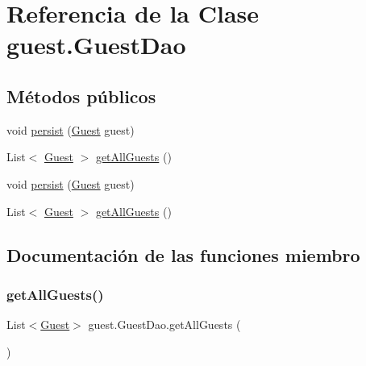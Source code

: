 \hypertarget{classguest_1_1_guest_dao}{}\section{Referencia de la Clase guest.\+Guest\+Dao}
\label{classguest_1_1_guest_dao}
\subsection*{Métodos públicos}
\begin{DoxyCompactItemize}
\item 
void \mbox{\hyperlink{classguest_1_1_guest_dao_a66dea98c577adb8b65be3f0f89862f60}{persist}} (\mbox{\hyperlink{classguest_1_1_guest}{Guest}} guest)
\item 
List$<$ \mbox{\hyperlink{classguest_1_1_guest}{Guest}} $>$ \mbox{\hyperlink{classguest_1_1_guest_dao_a64a8d49b454c84b3b76e8e8f0c4c3694}{get\+All\+Guests}} ()
\item 
void \mbox{\hyperlink{classguest_1_1_guest_dao_a66dea98c577adb8b65be3f0f89862f60}{persist}} (\mbox{\hyperlink{classguest_1_1_guest}{Guest}} guest)
\item 
List$<$ \mbox{\hyperlink{classguest_1_1_guest}{Guest}} $>$ \mbox{\hyperlink{classguest_1_1_guest_dao_a64a8d49b454c84b3b76e8e8f0c4c3694}{get\+All\+Guests}} ()
\end{DoxyCompactItemize}


\subsection{Documentación de las funciones miembro}
\mbox{\label{classguest_1_1_guest_dao_a64a8d49b454c84b3b76e8e8f0c4c3694}} 
\subsubsection{\texorpdfstring{getAllGuests()}{getAllGuests()}\hspace{0.1cm}{\footnotesize\ttfamily [1/2]}}
{\footnotesize\ttfamily List$<$\mbox{\hyperlink{classguest_1_1_guest}{Guest}}$>$ guest.\+Guest\+Dao.\+get\+All\+Guests (\begin{DoxyParamCaption}{ }\end{DoxyParamCaption})}

\mbox{\label{classguest_1_1_guest_dao_a64a8d49b454c84b3b76e8e8f0c4c3694}} 
